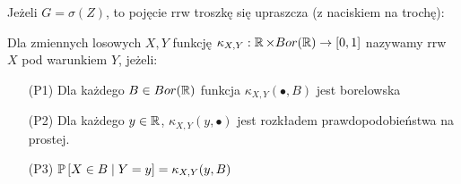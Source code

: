 Jeżeli $G=\sigma(Z)$, to pojęcie rrw troszkę się upraszcza (z naciskiem na trochę):

\begin{definition}
  Dla zmiennych losowych $X,Y$ funkcję $\kappa_{X,Y}:\operatorname{\mathbb{R}}\times Bor(\operatorname{\mathbb{R}})\to[0,1]$ nazywamy rrw $X$ pod warunkiem $Y$, jeżeli:
  \begin{itemize}
    \item[(P1)] Dla każdego $B\in Bor(\operatorname{\mathbb{R}})$ funkcja $\kappa_{X,Y}(\bullet, B)$ jest borelowska
    \item[(P2)] Dla każdego $y\in\operatorname{\mathbb{R}}$, $\kappa_{X,Y}(y,\bullet)$ jest rozkładem prawdopodobieństwa na prostej.
    \item[(P3)] $\prob{X\in B}{Y=y}=\kappa_{X,Y}(y, B)$
  \end{itemize}
\end{definition}
